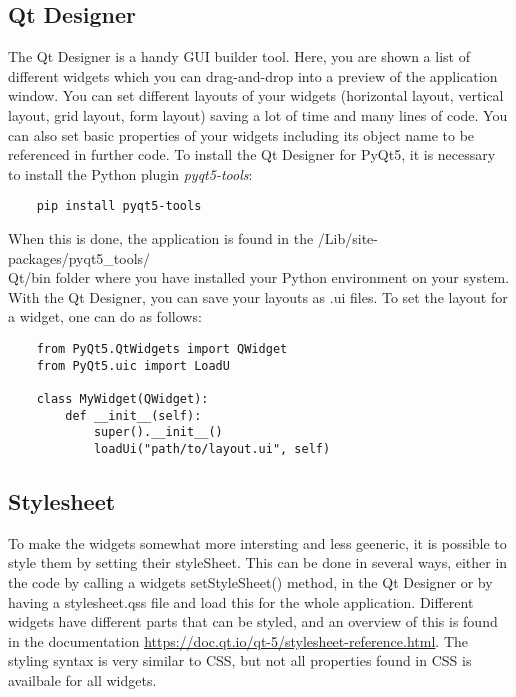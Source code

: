 \subsection{Qt Designer}

The Qt Designer is a handy GUI builder tool. Here, you are shown a list of different widgets which you can drag-and-drop into a preview of the application window. You can set different layouts of your widgets (horizontal layout, vertical layout, grid layout, form layout) saving a lot of time and many lines of code. You can also set basic properties of your widgets including its object name to be referenced in further code. To install the Qt Designer for PyQt5, it is necessary to install the Python plugin \textit{pyqt5-tools}:
\begin{verbatim}
    pip install pyqt5-tools
\end{verbatim}
When this is done, the application is found in the /Lib/site-packages/pyqt5\_tools/\\Qt/bin folder where you have installed your Python environment on your system. With the Qt Designer, you can save your layouts as .ui files. To set the layout for a widget, one can do as follows:
\begin{verbatim}
    from PyQt5.QtWidgets import QWidget
    from PyQt5.uic import LoadU
    
    class MyWidget(QWidget):
        def __init__(self):
            super().__init__()
            loadUi("path/to/layout.ui", self)
\end{verbatim}


\subsection{Stylesheet}

To make the widgets somewhat more intersting and less geeneric, it is possible to style them by setting their styleSheet. This can be done in several ways, either in the code by calling a widgets setStyleSheet() method, in the Qt Designer or by having a stylesheet.qss file and load this for the whole application. Different widgets have different parts that can be styled, and an overview of this is found in the documentation \url{https://doc.qt.io/qt-5/stylesheet-reference.html}. The styling syntax is very similar to CSS, but not all properties found in CSS is availbale for all widgets. 
